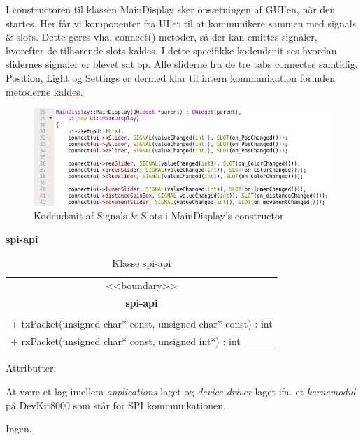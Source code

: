 I constructoren til klassen MainDisplay sker opsætningen af GUI'en, når den startes. Her får vi komponenter fra UI'et til at kommunikere sammen med signals \& slots. Dette gøres vha. connect() metoder, så der kan emittes signaler, hvorefter de tilhørende slots kaldes. I dette specifikke kodeudsnit ses hvordan slidernes signaler er blevet sat op. Alle sliderne fra de tre tabs connectes samtidig. Position, Light og Settings er dermed klar til intern kommunikation forinden metoderne kaldes.

\begin{figure}[H]
\centering
\includegraphics[width=0.9\linewidth]{0_Filer/Figuer/signalSlot.png}
\caption{Kodeudsnit af Signals \& Slots i MainDisplay's constructor}
\label{fig:signalSlot}
\end{figure}

{\centering \textbf{spi-api} \par}

\begin{table}[H]
    \centering
    \begin{tabular}{|l|}
    \hline
    \multicolumn{1}{|c|}{<<boundary>>} \\
    \multicolumn{1}{|c|}{\textbf{spi-api}} \\
    \hline
    \\
    \hline
    + txPacket(unsigned char* const, unsigned char* const) : int \\
    + rxPacket(unsigned char* const, unsigned int*) : int \\
    \hline
    \end{tabular}
    \caption{Klasse spi-api}
    \label{tab:classSpiApi}
\end{table}

\begin{labeling}{Attributter:}
\item[Ansvar:] At være et lag imellem \textit{applications}-laget og \textit{device driver}-laget ifa. et \textit{kernemodul} på DevKit8000 som står for SPI kommunikationen.
\item[Attributter:] Ingen.
\end{labeling}

